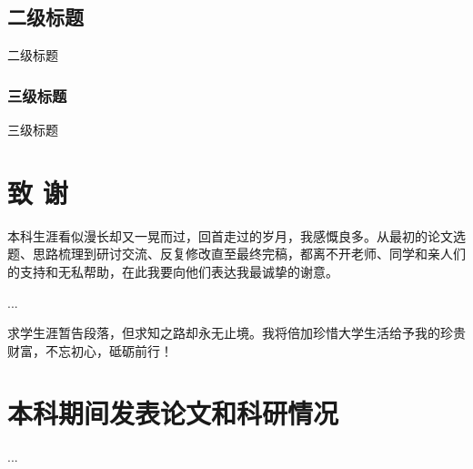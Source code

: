 \documentclass[openany,oneside]{book}
\theoremstyle{definition}
\begin{document}
	
	
	
	

\section{二级标题}

二级标题

\subsection{三级标题}

三级标题


\clearpage
{}
{}

\chapter*{致 \qquad 谢}
\thispagestyle{empty}
本科生涯看似漫长却又一晃而过，回首走过的岁月，我感慨良多。从最初的论文选题、思路梳理到研讨交流、反复修改直至最终完稿，都离不开老师、同学和亲人们的支持和无私帮助，在此我要向他们表达我最诚挚的谢意。

...

求学生涯暂告段落，但求知之路却永无止境。我将倍加珍惜大学生活给予我的珍贵财富，不忘初心，砥砺前行！
\chapter*{本科期间发表论文和科研情况}
\thispagestyle{empty}

...
\end{document}
